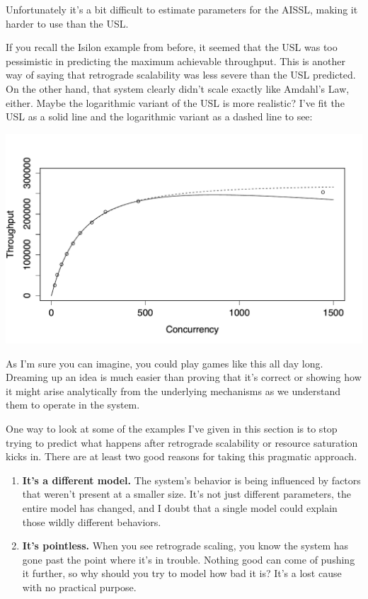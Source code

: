 \documentclass{vivid_layout}
\begin{document}
Unfortunately it's a bit difficult to estimate parameters for the AISSL, making
it harder to use than the USL. 

If you recall the Isilon example from before, it seemed that the USL was too
pessimistic in predicting the maximum achievable throughput. This is another
way of saying that retrograde scalability was less severe than the USL
predicted. On the other hand, that system clearly didn't scale exactly like
Amdahl's Law, either. Maybe the logarithmic variant of the USL is more
realistic? I've fit the USL as a solid line and the logarithmic variant as a
dashed line to see:
\begin{center}
\includegraphics[width=.85\linewidth]{scalability/isilon-logarithmic}
\end{center}

As I'm sure you can imagine, you could play games like this all day long.
Dreaming up an idea is much easier than proving that it's correct or showing
how it might arise analytically from the underlying mechanisms as we understand
them to operate in the system.

One way to look at some of the examples I've given in this section is to stop
trying to predict what happens after retrograde scalability or resource
saturation kicks in. There are at least two good reasons for taking this
pragmatic approach.

\begin{enumerate}
\item {\bfseries It's a different model.} The system's behavior is being
influenced by factors that weren't present at a smaller size. It's not just
different parameters, the entire model has changed, and I doubt that a
single model could explain those wildly different behaviors.
\item {\bfseries It's pointless.}  When you see retrograde scaling, you know the
system has gone past the point where it's in trouble. Nothing good can come of
pushing it further, so why should you try to model how bad it is? It's a lost
cause with no practical purpose.
\end{enumerate}
\end{document}
